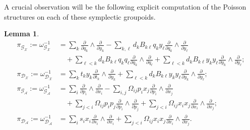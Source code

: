 \documentclass{amsart}
\newtheorem{lemma}[theorem]{Lemma}
\numberwithin{equation}{section}
\newcommand{\cA}{\mathcal{A}}
\newcommand{\cG}{\mathcal{G}}
\newcommand{\cD}{\mathcal{D}}
\newcommand{\cX}{\mathcal{X}}
\begin{document}
A crucial observation will be the following explicit computation of the Poisson structures on each of these symplectic groupoids.
\begin{lemma}
  \label{le:groupoid Poisson structures}
  \begin{align}
    \pi_{\cG_\cX}:=\omega_{\cG_\cX}^{-1}&=\sum_{k} \frac{\partial}{\partial q_k} \wedge \frac{\partial}{\partial y_k} - \sum_{k, \ell} d_kB_{k\ell}q_k y_\ell \frac{\partial}{\partial q_k} \wedge \frac{\partial}{\partial y_\ell}\\
    \nonumber &\quad+\sum_{\ell < k} d_kB_{k\ell}q_kq_\ell \frac{\partial}{\partial q_k} \wedge \frac{\partial}{\partial q_\ell}
		    +\sum_{\ell < k} d_kB_{k\ell}y_ky_\ell \frac{\partial}{\partial y_k} \wedge \frac{\partial}{\partial y_\ell};\\
    \pi_{\cD_\cX}:=\omega_{\cD_\cX}^{-1}&=\sum_{k} t_ky_k\frac{\partial}{\partial t_k} \wedge \frac{\partial}{\partial y_k}+\sum_{\ell < k} d_kB_{k\ell}y_ky_\ell \frac{\partial}{\partial y_k} \wedge \frac{\partial}{\partial y_\ell};\\
    \pi_{\cG_\cA}:=\omega_{\cG_\cA}^{-1}&=\sum_{i} \frac{\partial}{\partial p_i} \wedge \frac{\partial}{\partial x_i} - \sum_{i, j} \Omega_{ij}p_i x_j \frac{\partial}{\partial p_i} \wedge \frac{\partial}{\partial x_j}\\
    \nonumber &\quad+\sum_{j < i} \Omega_{ij}p_ip_j \frac{\partial}{\partial p_i} \wedge \frac{\partial}{\partial p_j}
		    +\sum_{j < i} \Omega_{ij}x_ix_j \frac{\partial}{\partial x_i} \wedge \frac{\partial}{\partial x_j};\\
    \pi_{\cD_\cA}:=\omega_{\cD_\cA}^{-1}&=\sum_{i} s_ix_i\frac{\partial}{\partial s_i} \wedge \frac{\partial}{\partial x_i}+\sum_{j < i} \Omega_{ij}x_ix_j \frac{\partial}{\partial x_i} \wedge \frac{\partial}{\partial x_j}.
  \end{align}
\end{lemma}
\end{document}
